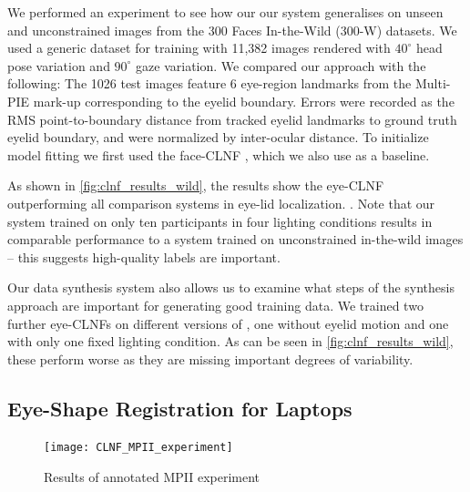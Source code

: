 

We performed an experiment to see how our our system generalises on unseen and unconstrained images from the 300 Faces In-the-Wild (300-W) \cite{sagonas2013300} datasets.
We used a generic \dataset dataset for training with 11,382 images rendered with $40^{\circ}$ head pose variation and $90^{\circ}$ gaze variation.
We compared our approach with the following: 
The 1026 test images feature 6 eye-region landmarks from the Multi-PIE \cite{gross2010multi} mark-up corresponding to the eyelid boundary. Errors were recorded as the RMS point-to-boundary distance from tracked eyelid landmarks to ground truth eyelid boundary, and were normalized by inter-ocular distance.
To initialize model fitting we first used the face-CLNF \cite{baltrusaitis2013constrained}, which we also use as a baseline.

As shown in \autoref{fig:clnf_results_wild}, the results show the eye-CLNF outperforming all comparison systems in eye-lid localization. . Note that our system trained on only ten participants in four lighting conditions results in comparable performance to a system trained on unconstrained in-the-wild images -- this suggests high-quality labels are important.

Our data synthesis system also allows us to examine what steps of the synthesis approach are important for generating good training data. We trained two further eye-CLNFs on different versions of \dataset, one without eyelid motion and one with only one fixed lighting condition. As can be seen in \autoref{fig:clnf_results_wild}, these perform worse as they are missing important degrees of variability.

\subsection{Eye-Shape Registration for Laptops}


\begin{figure}
    \centering
    \texttt{[image: CLNF\_MPII\_experiment]}
    \caption{Results of annotated MPII experiment}
    \label{fig:clnf_results_MPII}
\end{figure}



